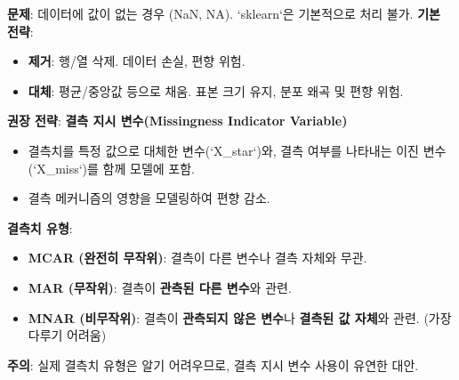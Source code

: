 \documentclass[11pt,a4paper]{article}
\begin{document}
\vspace{1em}

\begin{tcolorbox}[summarybox={결측치 처리 전략}]
\textbf{문제}: 데이터에 값이 없는 경우 (NaN, NA). `sklearn`은 기본적으로 처리 불가.
\textbf{기본 전략}:
\begin{itemize}
    \item \textbf{제거}: 행/열 삭제. 데이터 손실, 편향 위험.
    \item \textbf{대체}: 평균/중앙값 등으로 채움. 표본 크기 유지, 분포 왜곡 및 편향 위험.
\end{itemize}
\textbf{권장 전략}: \textbf{결측 지시 변수(Missingness Indicator Variable)}
\begin{itemize}
    \item 결측치를 특정 값으로 대체한 변수(`X_star`)와, 결측 여부를 나타내는 이진 변수(`X_miss`)를 함께 모델에 포함.
    \item 결측 메커니즘의 영향을 모델링하여 편향 감소.
\end{itemize}
\textbf{결측치 유형}:
\begin{itemize}
    \item \textbf{MCAR (완전히 무작위)}: 결측이 다른 변수나 결측 자체와 무관.
    \item \textbf{MAR (무작위)}: 결측이 \textbf{관측된 다른 변수}와 관련.
    \item \textbf{MNAR (비무작위)}: 결측이 \textbf{관측되지 않은 변수}나 \textbf{결측된 값 자체}와 관련. (가장 다루기 어려움)
\end{itemize}
\textbf{주의}: 실제 결측치 유형은 알기 어려우므로, 결측 지시 변수 사용이 유연한 대안.
\end{tcolorbox}
\end{document}
